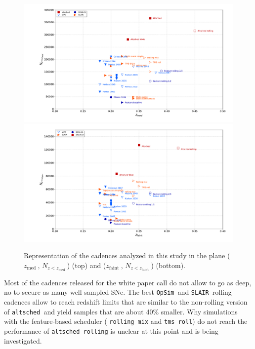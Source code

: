 \documentclass[a4paper,10pt]{article}
\newcommand{\zfaint}{$z_{\mathrm{faint}}\ $}
\newcommand{\nsnfaint}{$N_{z<z_{\mathrm{faint}}}\ $}
\newcommand{\zmed}{$z_{\mathrm{med}}\ $}
\newcommand{\nsnmed}{$N_{z<z_{\mathrm{med}}}\ $}
\newcommand{\opsim}{{\tt OpSim\ }}
\newcommand{\slair}{{\tt SLAIR\ }}
\newcommand{\altsched}{{\tt altsched\ }}
\begin{document}
\begin{figure}[htbp]
  \begin{center}
    \includegraphics[width=\linewidth]{summary_plot_wfd_mediansn.pdf}
    \includegraphics[width=\linewidth]{summary_plot_wfd_faintsn.pdf}
    \caption{Representation of the cadences analyzed in this study in
      the plane (\zmed, \nsnmed) (top) and (\zfaint, \nsnfaint) (bottom).}
    \label{fig:nsn_zmax_med}
  \end{center}
\end{figure}

Most of the cadences released for the white paper call do not allow to
go as deep, no to secure as many well sampled SNe. The best \opsim and
\slair rolling cadences allow to reach redshift limits that are
similar to the non-rolling version of \altsched and yield samples that
are about 40\% smaller. Why simulations with the feature-based scheduler ( {\tt rolling mix} and {\tt tms roll}) do not reach the
performance of {\tt altsched rolling} is unclear at this point and is
being investigated.



\newpage
\end{document}

